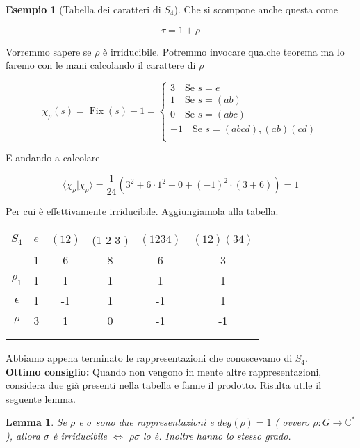 \documentclass[11pt]{article}
\theoremstyle{plain}
\newtheorem{lemma}[thm]{Lemma}
\theoremstyle{definition}
\newtheorem{exmp}{Esempio}[section]
\theoremstyle{remark}
\DeclareMathOperator{\Fix}{Fix}
\begin{document}
\begin{exmp}[Tabella dei caratteri di $S_4$]
Che si scompone anche questa come

\[ \tau = 1 + \rho\]

Vorremmo sapere se $\rho$ è irriducibile. Potremmo invocare qualche teorema ma lo faremo con le mani calcolando il carattere di $\rho$


\[ \chi_\rho(s) = \Fix(s) - 1 = 
\begin{cases}
3 \quad \text{Se } s = e \\
1 \quad \text{Se } s = (a b) \\
0 \quad \text{Se } s = (a b c) \\
-1 \quad \text{Se } s = (a b c d ), (a b) (c d)\\
\end{cases}
\]

E andando a calcolare

\[\langle\chi_\rho |\chi_\rho\rangle = \dfrac{1}{24}\left(3^2  + 6 \cdot 1^2  + 0 + (-1)^2 \cdot (3 +6 )\right) = 1\]
 

Per cui è effettivamente irriducibile.  Aggiungiamola alla tabella.


\begin{table}[!ht]
\centering
\begin{tabular}{|c|c|c|c|c|c|}
\hline
$S_4$  & $e$ & $(1 2)$ & (1 2 3 ) & $(1 2 3 4)$ & $(1 2)(3 4)$ \\
 & 1 & 6 & 8 & 6 & 3 \\
\hline
 $\rho_1$ & 1 & 1  & 1 & 1 & 1\\
\hline
$\epsilon$ & 1  & -1 & 1 & -1 & 1 \\
\hline
$\rho$& 3 & 1 & 0 & -1 & -1\\
\hline
& &  & & & \\
\hline
& &  & & & \\
\hline
\end{tabular}
\end{table}

Abbiamo appena terminato le rappresentazioni che conoscevamo di $S_4$.\\
\textbf{Ottimo consiglio:} Quando non vengono in mente altre rappresentazioni, considera due già presenti nella tabella e fanne il prodotto. Risulta utile il seguente lemma.

\begin{lemma}
Se $\rho$ e $\sigma$ sono due rappresentazioni e $deg(\rho)=1$ ( ovvero $\rho:G\rightarrow \mathbb{C}^*$), allora $\sigma$ è irriducibile $\Leftrightarrow$ $\rho\sigma$ lo è. Inoltre hanno lo stesso grado.
\end{lemma}


\end{exmp}
\end{document}
